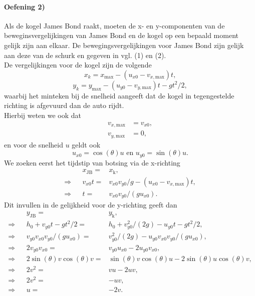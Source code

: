\documentclass[11pt]{article}
\begin{document}
\paragraph{Oefening 2)} Als de kogel James Bond raakt, moeten de x- en y-componenten van de beweginsvergelijkingen van James Bond en de kogel op een bepaald moment gelijk zijn aan elkaar. De bewegingsvergelijkingen voor James Bond zijn gelijk aan deze van de schurk en gegeven in vgl. (1) en (2).\\
De vergelijkingen voor de kogel zijn de volgende
\begin{equation}
    x_k = x_{\text{max}} - (u_{x0}-v_{x,\text{max}})t,
\end{equation}
\begin{equation}
    y_k = y_{\text{max}} - (u_{y0}-v_{y,\text{max}})t - gt^2/2,
\end{equation}
waarbij het minteken bij de snelheid aangeeft dat de kogel in tegengestelde richting is afgevuurd dan de auto rijdt.\\
Hierbij weten we ook dat 
\begin{equation}
    \begin{split}
       v_{x,\text{max}} &= v_{x0},\\
       v_{y,\text{max}} &= 0,
    \end{split}
\end{equation}
en voor de snelheid $u$ geldt ook
\begin{equation}
    u_{x0} = \cos(\theta) u \text{ en } u_{y0} = \sin(\theta) u.
\end{equation}
We zoeken eerst het tijdstip van botsing via de x-richting
\begin{align}
	&&x_{\text{JB}} =& x_{\text{k}},\\
    \Rightarrow&& v_{x0} t =& v_{x0} v_{y0}/g - (u_{x0}-v_{x,\text{max}})t,\\
    \Rightarrow&&t =& v_{x0} v_{y0}/(gu_{x0}).
\end{align}
Dit invullen in de gelijkheid voor de y-richting geeft dan
\begin{align}
        &&y_{\text{JB}} =& y_{\text{k}},\\
        \Rightarrow&& h_0 + v_{y0} t - gt^2/2 =& h_0 + v_{y0}^2 / (2g) - u_{y0}t- gt^2/2,\\
        \Rightarrow&&v_{y0} v_{x0} v_{y0}/(gu_{x0}) =& v_{y0}^2 / (2g) - u_{y0} v_{x0} v_{y0}/(gu_{x0}),\\
        \Rightarrow&&2v_{y0} v_{x0} =& v_{y0} u_{x0} - 2u_{y0} v_{x0} ,\\
        \Rightarrow&&2\sin(\theta) v \cos(\theta) v =& \sin(\theta) v \cos(\theta) u - 2 \sin(\theta) u \cos(\theta) v,\\
        \Rightarrow&&2v^2 =& vu - 2 uv,\\
        \Rightarrow&&2v^2 =& - uv,\\
         \Rightarrow&&u =& - 2v.\\
\end{align}
\end{document}
